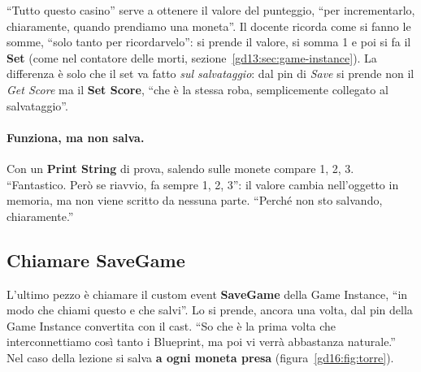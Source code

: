 ``Tutto questo casino'' serve a ottenere il valore del punteggio, ``per
incrementarlo, chiaramente, quando prendiamo una moneta''. Il docente ricorda
come si fanno le somme, ``solo tanto per ricordarvelo'': si prende il valore,
si somma 1 e poi si fa il \textbf{Set} (come nel contatore delle morti,
sezione~\ref{gd13:sec:game-instance}). La differenza è solo che il set va fatto
\emph{sul salvataggio}: dal pin di \emph{Save} si prende non il \emph{Get Score}
ma il \textbf{Set Score}, ``che è la stessa roba, semplicemente collegato al
salvataggio''.

\paragraph{Funziona, ma non salva.} Con un \textbf{Print String} di prova, salendo
sulle monete compare 1, 2, 3. ``Fantastico. Però se riavvio, fa sempre 1, 2,
3'': il valore cambia nell'oggetto in memoria, ma non viene scritto da nessuna
parte. ``Perché non sto salvando, chiaramente.''

\subsection{Chiamare SaveGame}

L'ultimo pezzo è chiamare il custom event \textbf{SaveGame} della Game Instance,
``in modo che chiami questo e che salvi''. Lo si prende, ancora una volta, dal pin
della Game Instance convertita con il cast. ``So che è la prima volta che
interconnettiamo così tanto i Blueprint, ma poi vi verrà abbastanza naturale.''
Nel caso della lezione si salva \textbf{a ogni moneta presa}
(figura~\ref{gd16:fig:torre}).

